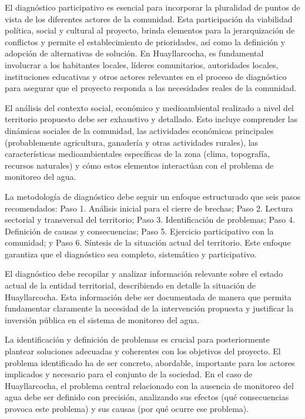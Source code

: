 El diagnóstico participativo es esencial para incorporar la pluralidad de puntos de vista de los diferentes actores de la comunidad. Esta participación da viabilidad política, social y cultural al proyecto, brinda elementos para la jerarquización de conflictos y permite el establecimiento de prioridades, así como la definición y adopción de alternativas de solución. En Huayllarcocha, es fundamental involucrar a los habitantes locales, líderes comunitarios, autoridades locales, instituciones educativas y otros actores relevantes en el proceso de diagnóstico para asegurar que el proyecto responda a las necesidades reales de la comunidad.


El análisis del contexto social, económico y medioambiental realizado a nivel del territorio propuesto debe ser exhaustivo y detallado. Esto incluye comprender las dinámicas sociales de la comunidad, las actividades económicas principales (probablemente agricultura, ganadería y otras actividades rurales), las características medioambientales específicas de la zona (clima, topografía, recursos naturales) y cómo estos elementos interactúan con el problema de monitoreo del agua.


La metodología de diagnóstico debe seguir un enfoque estructurado que seis pasos recomendados: Paso 1. Análisis inicial para el cierre de brechas; Paso 2. Lectura sectorial y transversal del territorio; Paso 3. Identificación de problemas; Paso 4. Definición de causas y consecuencias; Paso 5. Ejercicio participativo con la comunidad; y Paso 6. Síntesis de la situación actual del territorio. Este enfoque garantiza que el diagnóstico sea completo, sistemático y participativo.


El diagnóstico debe recopilar y analizar información relevante sobre el estado actual de la entidad territorial, describiendo en detalle la situación de Huayllarcocha. Esta información debe ser documentada de manera que permita fundamentar claramente la necesidad de la intervención propuesta y justificar la inversión pública en el sistema de monitoreo del agua.

La identificación y definición de problemas es crucial para posteriormente plantear soluciones adecuadas y coherentes con los objetivos del proyecto. El problema identificado ha de ser concreto, abordable, importante para los actores implicados y necesario para el conjunto de la sociedad. En el caso de Huayllarcocha, el problema central relacionado con la ausencia de monitoreo del agua debe ser definido con precisión, analizando sus efectos (qué consecuencias provoca este problema) y sus causas (por qué ocurre ese problema).

